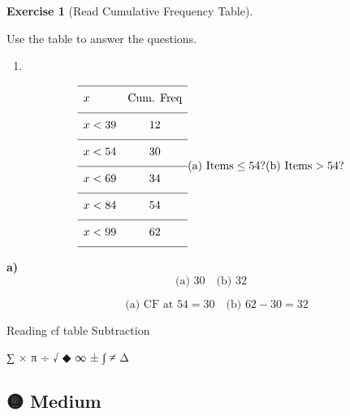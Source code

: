 \documentclass[
  letterpaper,
  DIV=11,
  numbers=noendperiod]{scrreprt}
\providecommand{\tightlist}{%
  \setlength{\itemsep}{0pt}\setlength{\parskip}{0pt}}
\theoremstyle{definition}
\newtheorem{exercise}{Exercise}[chapter]
\theoremstyle{remark}
\begin{document}
\begin{exercise}[Read Cumulative Frequency
Table]\protect\hypertarget{exr-cf-2}{}\label{exr-cf-2}

Use the table to answer the questions.

\begin{enumerate}
\def\labelenumi{\alph{enumi})}
\tightlist
\item
\end{enumerate}

\[{\renewcommand{\arraystretch}{1.6}\begin{array}{lc}
\hline x & \text{Cum. Freq} \\[4pt]
\hline x < 39 & 12 \\[4pt]
\hline x < 54 & 30 \\[4pt]
\hline x < 69 & 34 \\[4pt]
\hline x < 84 & 54 \\[4pt]
\hline x < 99 & 62 \\[4pt]
\hline
\end{array}}\\[8pt]\text{(a) Items} \leq 54\text{?}\\[6pt]\text{(b) Items} > 54\text{?}\]

\begin{tcolorbox}[enhanced jigsaw, opacitybacktitle=0.6, coltitle=black, arc=.35mm, colframe=quarto-callout-tip-color-frame, colback=white, bottomrule=.15mm, left=2mm, colbacktitle=quarto-callout-tip-color!10!white, titlerule=0mm, opacityback=0, title=\textcolor{quarto-callout-tip-color}{\faLightbulb}\hspace{0.5em}{🔍 View Solution}, leftrule=.75mm, breakable, rightrule=.15mm, bottomtitle=1mm, toptitle=1mm, toprule=.15mm]

\textbf{a)} \[\text{(a) }30\quad\text{(b) }32\]

\[\quad \text{(a) CF at }54=30\quad\text{(b) }62-30=32\]

\end{tcolorbox}

{Reading cf table} {Subtraction}

\end{exercise}

∑ × π ÷ √ ◆ ∞ ± ∫ ≠ Δ

\subsection{🟡 Medium}
\end{document}
